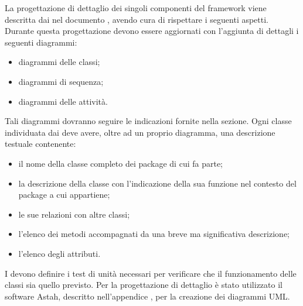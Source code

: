 La progettazione di dettaglio dei singoli componenti del framework \projectname{} viene descritta dai  nel documento , avendo cura di rispettare i seguenti aspetti.
Durante questa progettazione devono essere aggiornati con l'aggiunta di dettagli i seguenti diagrammi:
\begin{itemize}
\item diagrammi delle classi;
\item diagrammi di sequenza;
\item diagrammi delle attività.
\end{itemize}
Tali diagrammi dovranno seguire le indicazioni fornite nella sezione.
Ogni classe individuata dai  deve avere, oltre ad un proprio diagramma, una descrizione testuale contenente:
\begin{itemize}
\item il nome della classe completo dei package di cui fa parte;
\item la descrizione della classe con l'indicazione della sua funzione nel contesto del package a cui appartiene;
\item le sue relazioni con altre classi;
\item l'elenco dei metodi accompagnati da una breve ma significativa descrizione;
\item l'elenco degli attributi.
\end{itemize}
I  devono definire i test di unità necessari per verificare che il funzionamento delle classi sia quello previsto.
Per la progettazione di dettaglio è stato utilizzato il software Astah, descritto nell'appendice , per la creazione dei diagrammi UML.